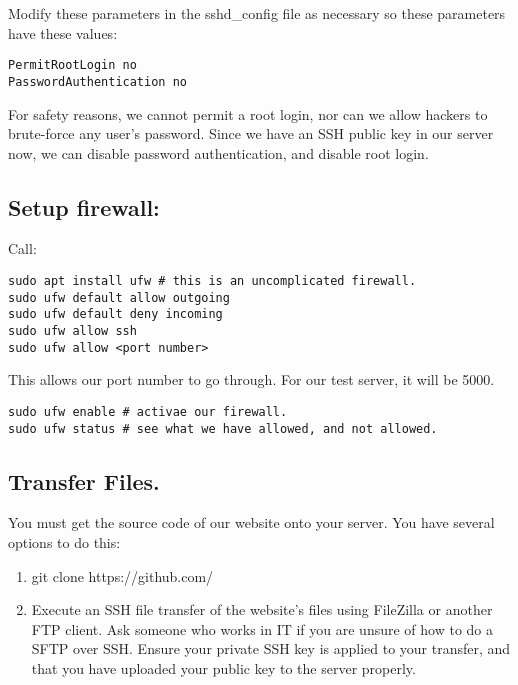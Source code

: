 Modify these parameters in the sshd\_config file as necessary so these
parameters have these values:

\begin{verbatim}
PermitRootLogin no
PasswordAuthentication no
\end{verbatim}

For safety reasons, we cannot permit a root login, nor can we allow
hackers to brute-force any user's password. Since we have an SSH public
key in our server now, we can disable password authentication, and
disable root login.

\subsection{Setup firewall:}\label{setup-firewall}

Call:

\begin{verbatim}
sudo apt install ufw # this is an uncomplicated firewall. 
sudo ufw default allow outgoing
sudo ufw default deny incoming
sudo ufw allow ssh
sudo ufw allow <port number> 
\end{verbatim}

This allows our port number to go through. For our test server, it will
be 5000.

\begin{verbatim}
sudo ufw enable # activae our firewall.
sudo ufw status # see what we have allowed, and not allowed.
\end{verbatim}

\subsection{Transfer Files.}\label{transfer-files.}

You must get the source code of our website onto your server. You have
several options to do this:

\begin{enumerate}
\def\labelenumi{\alph{enumi}.}
\item
  git clone https://github.com/
\item
  Execute an SSH file transfer of the website's files using FileZilla or
  another FTP client. Ask someone who works in IT if you are unsure of
  how to do a SFTP over SSH. Ensure your private SSH key is applied to
  your transfer, and that you have uploaded your public key to the
  server properly.
\end{enumerate}

